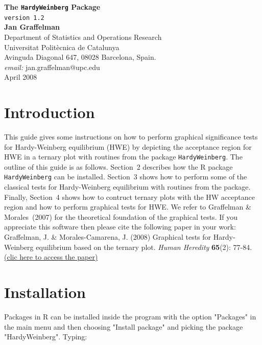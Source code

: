 \documentclass[a4paper]{article}
\begin{document}
\begin{center}
\sf
{\sf \bf \Large The {\tt HardyWeinberg} Package}\\
\vspace{4mm}
{\sf \normalsize {\tt version 1.2}}\\
\vspace{4mm}
{\bf \large Jan Graffelman}\\
\vspace{4mm} \rm \large
Department of Statistics and Operations Research\\
Universitat Polit\`ecnica de Catalunya\\
Avinguda Diagonal 647, 08028 Barcelona, Spain.\\
{\it email:} jan.graffelman@upc.edu\\
\vspace{4mm}
{\sc April 2008}
\end{center}

\section{Introduction}

This guide gives some instructions on how to perform graphical significance tests for Hardy-Weinberg
equilibrium (HWE) by depicting the acceptance region for HWE in a ternary plot with routines from
the package {\tt HardyWeinberg}. The outline of this guide is as follows. Section~2 
describes how the R package {\tt HardyWeinberg} can be installed. Section~3 shows 
how to perform some of the classical tests for Hardy-Weinberg equilibrium with routines from the package. 
Finally, Section~4 shows how to contruct ternary plots with the HW acceptance region 
and how to perform graphical tests for HWE. We refer to Graffelman \& Morales~(2007) 
for the theoretical foundation of the graphical tests. If you appreciate this software then please 
cite the following paper in your work:\\

Graffelman, J. \& Morales-Camarena, J. (2008) Graphical tests for Hardy-Weinberg equilibrium
based on the ternary plot. {\it Human Heredity} {\bf 65}(2): 77-84. 
\href{http://dx.doi.org/10.1159/000108939}{(clic here to access the paper)}

\section{Installation}
\label{sec:install}

Packages in R can be installed inside the program with the option "Packages"
in the main menu and then choosing "Install package" and picking the package
"HardyWeinberg". Typing:
\end{document}

